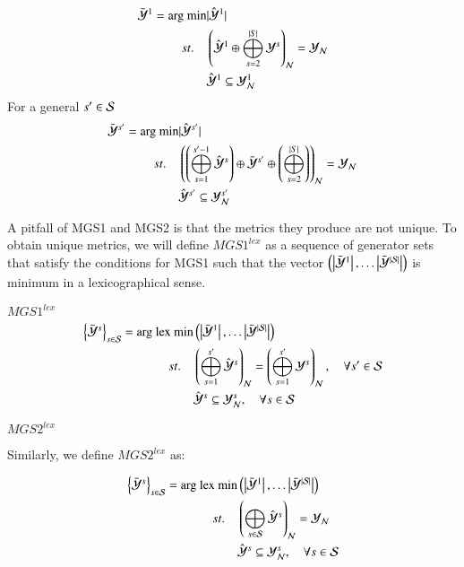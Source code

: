 \begin{enumerate}
\begin{align}
    \bY^1  =  \text{arg min} &\lvert \hY^1 \rvert \\ 
    st. \quad& \left( \hY^1 \+ \msum_{s=2}^{\abs{S}} \Y^s \right)_\mcN = \Yn  \nonumber  \\
	     & \hY^1 \subseteq \Yn^1\nonumber
\end{align}
For a general $s' \in \S$
\begin{align}
    \bY^{s'} = \text{arg min} &\lvert \hY^{s'} \rvert \\ 
    st. \quad& \left( \left(\msum_{s = 1}^{s'-1} \hY^s \right) \+ \bY^{s'} \+ \left(\msum_{s=2}^{\abs{S}} \right)\right)_\mcN = \Yn  \nonumber  \\
	     & \hY^{s'} \subseteq \Yn^{s'}\nonumber
\end{align}


A pitfall of MGS1 and MGS2 is that the metrics they produce are not unique. To obtain unique metrics, we will define $MGS1^{lex}$ as a sequence of generator sets that satisfy the conditions for MGS1 such that the vector $ \left(\abs{\bY^1}, \hdots \abs{\bY^{\abs{\S}}}\right) $ is minimum in a lexicographical sense.

\textbf{$MGS1^{lex}$}
\begin{align}
\left\{ \Ycs  \right\}_{s \in \S}
     = \text{arg lex min} &  \left(\abs{\bY^1}, \hdots \abs{\bY^{\abs{\S}}}\right)  \\ 
    st. \quad& \left(  \msum_{s = 1}^{s'} \hY^s  \right)_\mcN = \left( \msum_{s=1}^{s'} \Y^s \right)_\mcN  \nonumber, \quad \forall s' \in \S  \nonumber\\
	     & \hY^{s} \subseteq \Yn^{s}, \quad \forall s \in \S \nonumber
\end{align}


\textbf{$MGS2^{lex}$}

Similarly, we define $MGS2^{lex}$ as:

\begin{align}
\left\{ \Ycs  \right\}_{s \in \S}
     = \text{arg lex min} &  \left(\abs{\bY^1}, \hdots \abs{\bY^{\abs{\S}}}\right)  \\ 
    st. \quad& \left(  \msum_{s \in \S} \hY^s  \right)_\mcN = \Yn \nonumber \\
	     & \hY^{s} \subseteq \Yn^{s}, \quad \forall s \in \S \nonumber
\end{align}
\end{enumerate}


